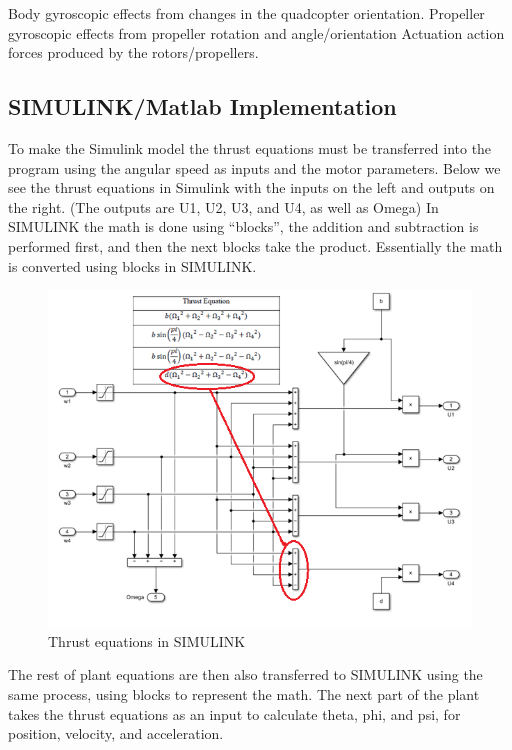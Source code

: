Body gyroscopic effects from changes in the quadcopter orientation.
Propeller gyroscopic effects from propeller rotation and angle/orientation
Actuation action forces produced by the rotors/propellers.

\subsection{SIMULINK/Matlab Implementation}
To make the Simulink model the thrust equations must be transferred into the program using the angular speed as inputs and the motor parameters. Below we see the thrust equations in Simulink with the inputs on the left and outputs on the right. (The outputs are U1, U2, U3, and U4, as well as Omega) In SIMULINK the math is done using “blocks”, the addition and subtraction is performed first, and then the next blocks take the product. Essentially the math is converted using blocks in SIMULINK.

\begin{figure}[H]
\begin{center}
   \includegraphics[scale =1]{pictures/control/thrust equation in simulink.png}
\end{center}
\caption{Thrust equations in SIMULINK}
\end{figure}

The rest of plant equations are then also transferred to SIMULINK using the same process, using blocks to represent the math. The next part of the plant takes the thrust equations as an input to calculate theta, phi, and psi, for position, velocity, and acceleration. \\

